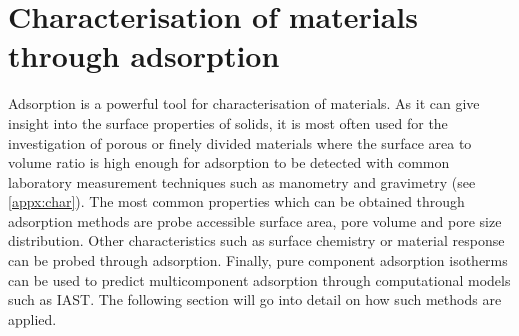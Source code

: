 
\section{Characterisation of materials through adsorption}

Adsorption is a powerful tool for characterisation of materials.
As it can give insight into the surface properties of solids, it
is most often used for the investigation of porous or finely
divided materials where the surface area to volume ratio is
high enough for adsorption to be detected with common laboratory
measurement techniques such as manometry and gravimetry (see
\autoref{appx:char}). The most common properties which can
be obtained through adsorption methods are probe accessible
surface area, pore volume and pore size distribution. Other
characteristics such as surface chemistry or material response
can be probed through adsorption. Finally, pure component adsorption
isotherms can be used to predict multicomponent adsorption through
computational models such as IAST. The following section will go into
detail on how such methods are applied.



